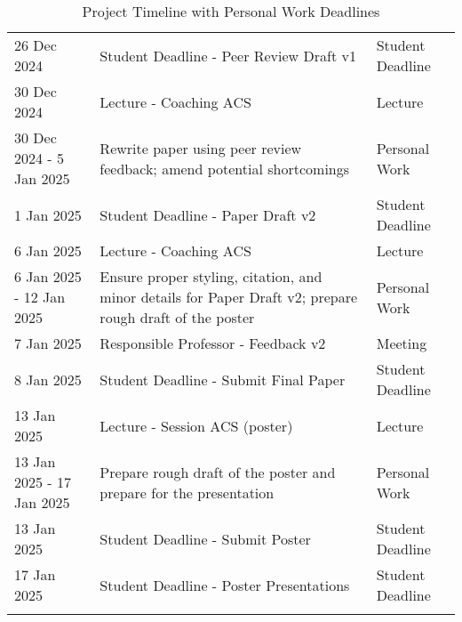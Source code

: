 \documentclass[
]{article}
\begin{document}
\begin{longtable}{p{} p{} p{}}
26 Dec 2024 & Student Deadline - Peer Review Draft v1 & Student Deadline \\

30 Dec 2024 & Lecture - Coaching ACS & Lecture \\

30 Dec 2024 - 5 Jan 2025 & Rewrite paper using peer review feedback; amend potential shortcomings & Personal Work \\

1 Jan 2025 & Student Deadline - Paper Draft v2 & Student Deadline \\

6 Jan 2025 & Lecture - Coaching ACS & Lecture \\

6 Jan 2025 - 12 Jan 2025 & Ensure proper styling, citation, and minor details for Paper Draft v2; prepare rough draft of the poster & Personal Work \\

7 Jan 2025 & Responsible Professor - Feedback v2 & Meeting \\

8 Jan 2025 & Student Deadline - Submit Final Paper & Student Deadline \\

13 Jan 2025 & Lecture - Session ACS (poster) & Lecture \\

13 Jan 2025 - 17 Jan 2025 & Prepare rough draft of the poster and prepare for the presentation & Personal Work \\

13 Jan 2025 & Student Deadline - Submit Poster & Student Deadline \\

17 Jan 2025 & Student Deadline - Poster Presentations & Student Deadline \\
\bottomrule
\caption{Project Timeline with Personal Work Deadlines}
\end{longtable}
\end{document}
